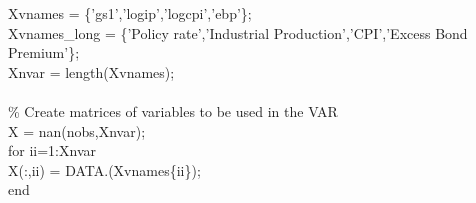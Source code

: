 \hspace{1mm}\hspace{5mm} \hspace{5mm} Xvnames      = \{\textcolor{matlabpurple}{'gs1'},\textcolor{matlabpurple}{'logip'},\textcolor{matlabpurple}{'logcpi'},\textcolor{matlabpurple}{'ebp'}\}; \\ 
\hspace{1mm}\hspace{5mm} \hspace{5mm} Xvnames\_long = \{\textcolor{matlabpurple}{'Policy rate'},\textcolor{matlabpurple}{'Industrial Production'},\textcolor{matlabpurple}{'CPI'},\textcolor{matlabpurple}{'Excess Bond Premium'}\}; \\ 
\hspace{1mm}\hspace{5mm} \hspace{5mm} Xnvar        = length(Xvnames); \\ 
\hspace{1mm}\hspace{5mm} \hspace{5mm}  \\ 
\hspace{1mm}\hspace{5mm} \hspace{5mm} \textcolor{matlabgreen}{\% Create matrices of variables to be used in the VAR }\\ 
\hspace{1mm}\hspace{5mm} \hspace{5mm} X = nan(nobs,Xnvar); \\ 
\hspace{1mm}\hspace{5mm} \hspace{5mm} \textcolor{matlabblue}{for} ii=1:Xnvar \\ 
\hspace{1mm}\hspace{5mm} \hspace{5mm} \hspace{5mm} X(:,ii) = DATA.(Xvnames\{ii\}); \\ 
\hspace{1mm}\hspace{5mm} \hspace{5mm} \textcolor{matlabblue}{end} \\ 
\hspace{1mm}\hspace{5mm} \hspace{5mm}  \\ 

